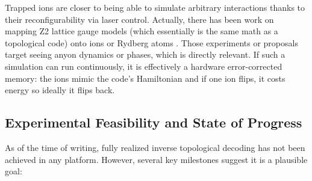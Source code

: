 \documentclass[11pt]{article}
\begin{document}
Trapped ions are closer to being able to simulate arbitrary interactions thanks to their reconfigurability via laser control. Actually, there has been work on mapping Z2 lattice gauge models (which essentially is the same math as a topological code) onto ions or Rydberg atoms \cite{Homeier2023Ry}. Those experiments or proposals target seeing anyon dynamics or phases, which is directly relevant. If such a simulation can run continuously, it is effectively a hardware error-corrected memory: the ions mimic the code's Hamiltonian and if one ion flips, it costs energy so ideally it flips back.

\subsection{Experimental Feasibility and State of Progress}
As of the time of writing, fully realized inverse topological decoding has not been achieved in any platform. However, several key milestones suggest it is a plausible goal:
\end{document}
